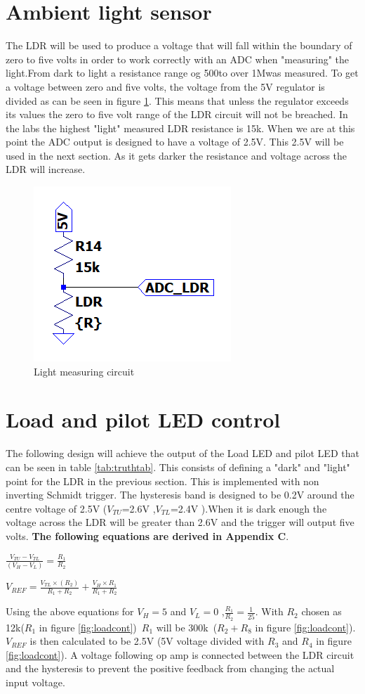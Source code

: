 \section{Ambient light sensor}
The LDR will be used to produce a voltage that will fall within the boundary of zero to five volts in order to work correctly with an ADC when "measuring" the light.From dark to light a resistance range og 500\textohm to over 1M\textohm was measured.  To get a voltage between zero and five volts, the voltage from the 5V regulator is divided as can be seen in figure \ref{fig:LDR}. This means that unless the regulator exceeds its values the zero to five volt range of the LDR circuit will not be breached. In the labs the highest "light" measured LDR resistance is 15k\textohm. When we are at this point the ADC output is designed to have a voltage of 2.5V. This 2.5V will be used in the next section. As it gets darker the resistance and voltage across the LDR will increase.


\begin{figure}[!htb]
	\centering
	\includegraphics[width=0.15\linewidth]{Figures/A7/LDRcirc.png}
	\caption{Light measuring circuit}
	\label{fig:LDR}
\end{figure}

\section{Load and pilot LED control}

The following design will achieve the output of the Load LED and pilot LED that can be seen in table \ref{tab:truthtab}. 
 This consists of defining a "dark" and "light" point for the LDR in the previous section. This is implemented with non inverting Schmidt trigger. The hysteresis band is designed to be 0.2V around the centre voltage of 2.5V ($V_{TU}$=2.6V ,$V_{TL}$=2.4V ).When it is dark enough the voltage across the LDR will be greater than 2.6V and the trigger will output five volts. \textbf{The following equations are derived  in Appendix C}.

\begin{center}
	$\frac{V_{TU}-V_{TL}}{(V_{H}-V_L)}=\frac{R_1}{R_2}$  
\end{center}

\begin{center}
	
	$	V_{REF}=\frac{V_{TL}\times (R_2)}{R_1+R_2}+\frac{V_{H}\times R_1}{R_1+R_2}$
\end{center}
Using the above equations for $V_H=5$ and $V_L=0$ ,$\frac{R_1}{R_2}=\frac{1}{25}$. With $R_2$ chosen as 12k\textohm ($R_1$ in figure \ref{fig:loadcont})\ $R_1$ will be 300k\textohm \ ($R_2+R_8$ in figure \ref{fig:loadcont}). $V_{REF}$ is then calculated to be 2.5V (5V voltage divided with $R_3$ and $R_4$ in figure \ref{fig:loadcont}). A voltage following op amp is connected between the LDR circuit and the hysteresis to prevent the positive feedback from changing the actual input voltage. 

